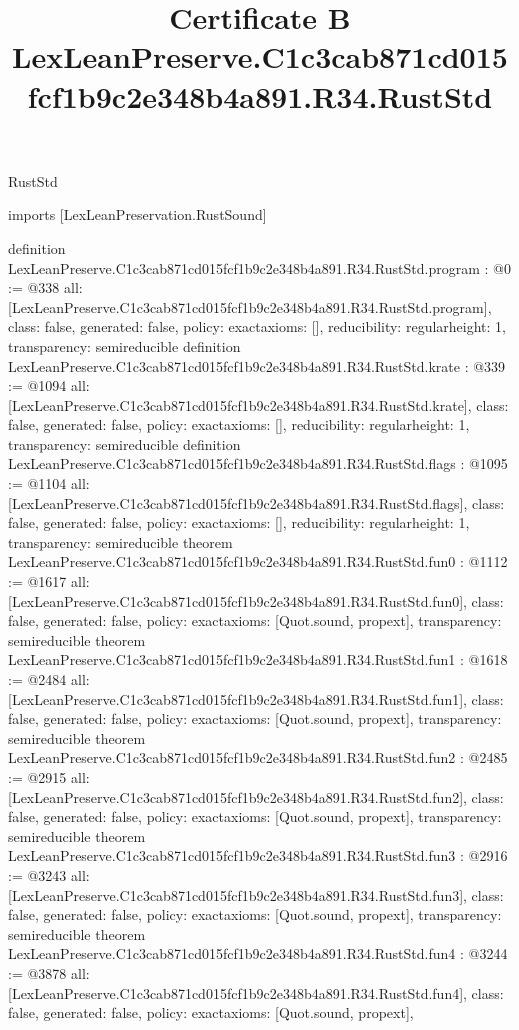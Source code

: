 \begin{lexlean}{RustStd}
\title{Certificate B LexLeanPreserve.C1c3cab871cd015fcf1b9c2e348b4a891.R34.RustStd}
\begin{coremodule}
imports [LexLeanPreservation.RustSound]

definition LexLeanPreserve.C1c3cab871cd015fcf1b9c2e348b4a891.R34.RustStd.program : @0 := @338 {
  all: [LexLeanPreserve.C1c3cab871cd015fcf1b9c2e348b4a891.R34.RustStd.program],
  class: false,
  generated: false,
  policy: exact{axioms: []},
  reducibility: regular{height: 1},
  transparency: semireducible
}
definition LexLeanPreserve.C1c3cab871cd015fcf1b9c2e348b4a891.R34.RustStd.krate : @339 := @1094 {
  all: [LexLeanPreserve.C1c3cab871cd015fcf1b9c2e348b4a891.R34.RustStd.krate],
  class: false,
  generated: false,
  policy: exact{axioms: []},
  reducibility: regular{height: 1},
  transparency: semireducible
}
definition LexLeanPreserve.C1c3cab871cd015fcf1b9c2e348b4a891.R34.RustStd.flags : @1095 := @1104 {
  all: [LexLeanPreserve.C1c3cab871cd015fcf1b9c2e348b4a891.R34.RustStd.flags],
  class: false,
  generated: false,
  policy: exact{axioms: []},
  reducibility: regular{height: 1},
  transparency: semireducible
}
theorem LexLeanPreserve.C1c3cab871cd015fcf1b9c2e348b4a891.R34.RustStd.fun0 : @1112 := @1617 {
  all: [LexLeanPreserve.C1c3cab871cd015fcf1b9c2e348b4a891.R34.RustStd.fun0],
  class: false,
  generated: false,
  policy: exact{axioms: [Quot.sound, propext]},
  transparency: semireducible
}
theorem LexLeanPreserve.C1c3cab871cd015fcf1b9c2e348b4a891.R34.RustStd.fun1 : @1618 := @2484 {
  all: [LexLeanPreserve.C1c3cab871cd015fcf1b9c2e348b4a891.R34.RustStd.fun1],
  class: false,
  generated: false,
  policy: exact{axioms: [Quot.sound, propext]},
  transparency: semireducible
}
theorem LexLeanPreserve.C1c3cab871cd015fcf1b9c2e348b4a891.R34.RustStd.fun2 : @2485 := @2915 {
  all: [LexLeanPreserve.C1c3cab871cd015fcf1b9c2e348b4a891.R34.RustStd.fun2],
  class: false,
  generated: false,
  policy: exact{axioms: [Quot.sound, propext]},
  transparency: semireducible
}
theorem LexLeanPreserve.C1c3cab871cd015fcf1b9c2e348b4a891.R34.RustStd.fun3 : @2916 := @3243 {
  all: [LexLeanPreserve.C1c3cab871cd015fcf1b9c2e348b4a891.R34.RustStd.fun3],
  class: false,
  generated: false,
  policy: exact{axioms: [Quot.sound, propext]},
  transparency: semireducible
}
theorem LexLeanPreserve.C1c3cab871cd015fcf1b9c2e348b4a891.R34.RustStd.fun4 : @3244 := @3878 {
  all: [LexLeanPreserve.C1c3cab871cd015fcf1b9c2e348b4a891.R34.RustStd.fun4],
  class: false,
  generated: false,
  policy: exact{axioms: [Quot.sound, propext]},
}
\end{coremodule}
\end{lexlean}
